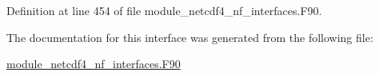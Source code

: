 Definition at line 454 of file module\+\_\+netcdf4\+\_\+nf\+\_\+interfaces.\+F90.



The documentation for this interface was generated from the following file\+:\begin{DoxyCompactItemize}
\item 
\hyperlink{module__netcdf4__nf__interfaces_8F90}{module\+\_\+netcdf4\+\_\+nf\+\_\+interfaces.\+F90}\end{DoxyCompactItemize}
